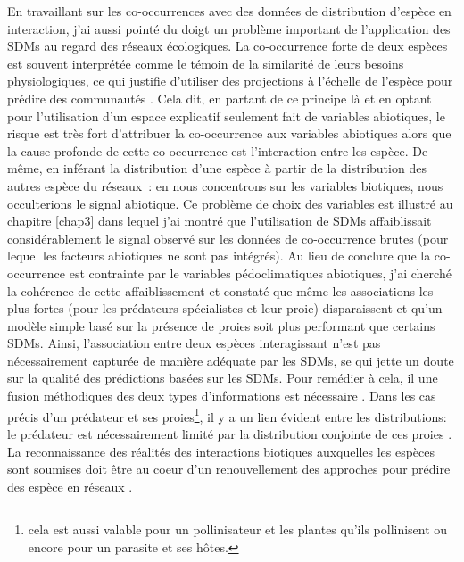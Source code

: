 En travaillant sur les co-occurrences avec des données de distribution
d'espèce en interaction, j'ai aussi pointé du doigt un problème
important de l'application des SDMs au regard des réseaux écologiques.
La co-occurrence forte de deux espèces est souvent interprétée comme le
témoin de la similarité de leurs besoins physiologiques, ce qui justifie
d'utiliser des projections à l'échelle de l'espèce pour prédire des
communautés \citep{Rehfeldt2006, Albouy2012}. Cela dit, en partant de ce
principe là et en optant pour l'utilisation d'un espace explicatif
seulement fait de variables abiotiques, le risque est très fort
d'attribuer la co-occurrence aux variables abiotiques alors que la cause
profonde de cette co-occurrence est l'interaction entre les espèce. De
même, en inférant la distribution d'une espèce à partir de la
distribution des autres espèce du réseaux~: en nous concentrons sur les
variables biotiques, nous occulterions le signal abiotique. Ce problème
de choix des variables est illustré au chapitre \ref{chap3} dans lequel
j'ai montré que l'utilisation de SDMs affaiblissait considérablement le
signal observé sur les données de co-occurrence brutes (pour lequel les
facteurs abiotiques ne sont pas intégrés). Au lieu de conclure que la
co-occurrence est contrainte par le variables pédoclimatiques
abiotiques, j'ai cherché la cohérence de cette affaiblissement et
constaté que même les associations les plus fortes (pour les prédateurs
spécialistes et leur proie) disparaissent et qu'un modèle simple basé
sur la présence de proies soit plus performant que certains SDMs. Ainsi,
l'association entre deux espèces interagissant n'est pas nécessairement
capturée de manière adéquate par les SDMs, se qui jette un doute sur la
qualité des prédictions basées sur les SDMs. Pour remédier à cela, il
une fusion méthodiques des deux types d'informations est nécessaire
\citep{Meier2010, Thuiller2013}. Dans les cas précis d'un prédateur et
ses proies\footnote{cela est aussi valable pour un pollinisateur et les
  plantes qu'ils pollinisent ou encore pour un parasite et ses hôtes.},
il y a un lien évident entre les distributions: le prédateur est
nécessairement limité par la distribution conjointe de ces proies
\citep{Holt2009, Shenbrot2007}. La reconnaissance des réalités des
interactions biotiques auxquelles les espèces sont soumises doit être au
coeur d'un renouvellement des approches pour prédire des espèce en
réseaux \citep{Godsoe2015}.

